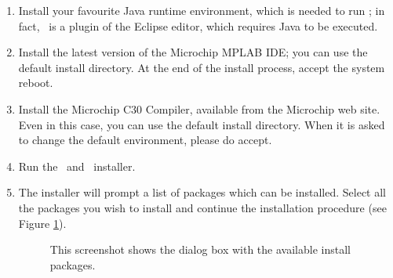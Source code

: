 \begin{enumerate}

\item Install your favourite Java runtime environment, which is needed
  to run \rtd; in fact, \rtd\ is a plugin of the Eclipse editor, which
  requires Java to be executed.

\item Install the latest version of the Microchip MPLAB IDE; you can
  use the default install directory. At the end of the install
  process, accept the system reboot.
  
\item Install the Microchip C30 Compiler, available from the Microchip
  web site.  Even in this case, you can use the default install
  directory. When it is asked to change the default environment,
  please do accept.

\item Run the \ee\ and \rtd\ installer.

\item The installer will prompt a list of packages which can be
  installed. Select all the packages you wish to install and
  continue the installation procedure (see Figure \ref{fig:installer-options}).
%
\begin{figure}[htb]
\caption{This screenshot shows the dialog box with the available install packages.}
\label{fig:installer-options}
\end{figure}



\end{enumerate}
